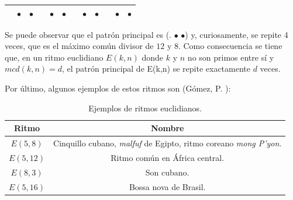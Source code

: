 \documentclass[a4paper, openright, 11pt, titlepage]{report}
\theoremstyle{definition}\newtheorem{defin}[propo]{Definition}
\theoremstyle{definition}\newtheorem{obser}[propo]{Remark}
\theoremstyle{definition}\newtheorem{ejem}[propo]{Ejemplo}
\theoremstyle{definition}\newtheorem{algoritmo}[propo]{Algoritmo}
\begin{document}
\begin{enumerate}
    \begin{table}[H]
        \centering
        \begin{tabular}{|c|c|c|c|c|c|c|c|c|c|c|c|}
        \hline
            & $\bullet$ & $\bullet$ & & $\bullet$ & $\bullet$ & & $\bullet$ & $\bullet$ & &$\bullet$ & $\bullet$\\
            \hline
        \end{tabular}
    \end{table}
    Se puede observar que el patrón principal es (\hspace{0.1cm}. \hspace{0.1cm} $\bullet$ \hspace{0.1cm} $\bullet$) y, curiosamente, se repite 4 veces, que es el máximo común divisor de $12$ y $8$. Como consecuencia se tiene que, en un ritmo euclidiano $E(k,n)$ donde $k$ y $n$ no son primos entre sí y $mcd(k,n) = d$, el patrón principal de E(k,n) se repite exactamente $d$ veces.
\end{enumerate}
Por último, algunos ejemplos de estos ritmos son (Gómez, P. \cite{ritmos}):
\begin{table}[H]
    \centering
    \begin{tabular}{|c|c|}
    \hline
      Ritmo   &  Nombre\\
      \hline \hline
      $E(5,8)$ & Cinquillo cubano, \textit{malfuf} de Egipto, ritmo coreano \textit{mong P'yon}.\\
      \hline
      $E(5,12)$ & Ritmo común en África central.\\
      \hline
      $E(8,3)$ & Son cubano.\\
      \hline
      $E(5, 16)$ & Bossa nova de Brasil.\\
      \hline
    \end{tabular}
    \caption{Ejemplos de ritmos euclidianos.}
\end{table}
\end{document}
